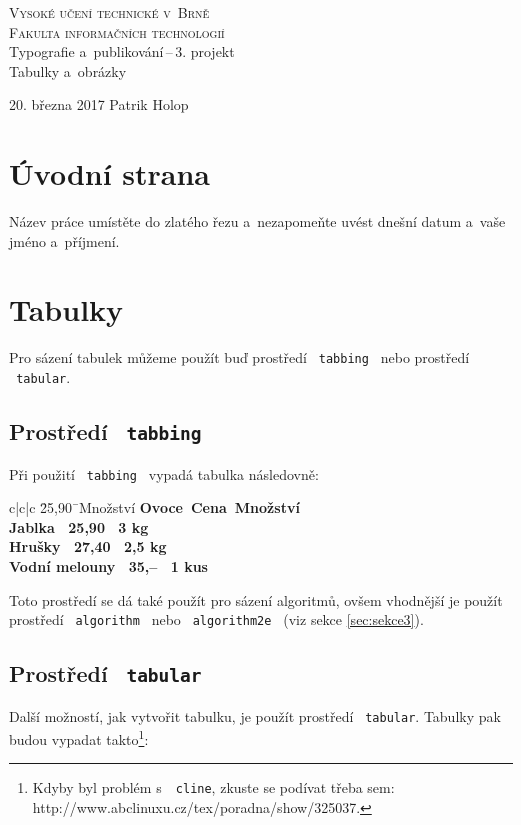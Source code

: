 \documentclass[11pt, a4paper]{article}
\begin{document}
\begin{titlepage}
 \begin{center}
 {
  \Huge
  \textsc{Vysoké učení technické v~Brně\\
  \vspace{-2mm}
  \huge
  Fakulta informačních technologií}\\
 }
 {
  \LARGE
  Typografie a~publikování\,--\,3. projekt\\
 }
  \vspace{-0.5mm}
 { 
  \Huge
  Tabulky a~obrázky\\
 }
 \end{center}
{\Large 20. března 2017 \hfill Patrik Holop}
\end{titlepage}

\section{Úvodní strana}
Název práce umístěte do zlatého řezu a~nezapomeňte uvést dnešní datum a~vaše jméno a~příjmení.

\section{Tabulky}
Pro sázení tabulek můžeme použít buď prostředí \texttt{\ tabbing\ } nebo prostředí \texttt{\ tabular}.

\subsection{Prostředí \texttt{\ tabbing}}
Při použití \texttt{\ tabbing\ } vypadá tabulka následovně:

\begin{tabbing}{c|c|c}
 \qquad\qquad\quad\= 25,90\quad\= \ Množství\kill
 \bfseries Ovoce\>\bfseries \ Cena\>\bfseries \ Množství\\
 Jablka\> \ 25,90 \> \ 3 kg\\
 Hrušky\> \ 27,40 \> \ 2,5 kg\\
 Vodní melouny\> \ 35,--\> \ 1 kus\\
\end{tabbing}
Toto prostředí se dá také použít pro sázení algoritmů, ovšem vhodnější je použít 
prostředí \texttt{\ algorithm\ } nebo \texttt{\ algorithm2e\ } (viz sekce \ref{sec:sekce3}).

\subsection{Prostředí \texttt{\ tabular}}
Další možností, jak vytvořit tabulku, je použít prostředí \texttt{\ tabular}. Tabulky pak 
budou vypadat takto\footnote{Kdyby byl problém s~\texttt{\ cline}, zkuste se podívat třeba sem: http://www.abclinuxu.cz/tex/poradna/show/325037.}:
\end{document}
